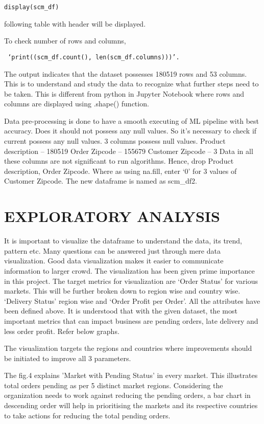 \documentclass[journal,twoside,web]{ieeecolor}
\begin{document}
\begin{verbatim}
display(scm_df)
 \end{verbatim}

following table with header will be displayed.

 To check number of rows and columns,

\begin{verbatim}
 ‘print((scm_df.count(), len(scm_df.columns)))’.
 \end{verbatim}

 The output indicates that the dataset possesses 180519 rows and 53 columns. This is to understand and study the data to recognize what further steps need to be taken. This is different from python in Jupyter Notebook where rows and columns are displayed using .shape() function.


Data pre-processing is done to have a smooth executing of ML pipeline with best accuracy. Does it should not possess any null values. So it’s necessary to check if current possess any null values. 3 columns possess null values. 
Product description – 180519
Order Zipcode – 155679
Customer Zipcode – 3
Data in all these columns are not significant to run algorithms. Hence, drop Product description, Order Zipcode. Where as using na.fill, enter ‘0’ for 3 values of Customer Zipcode. The new dataframe is named as scm{\_}df2.


\section{EXPLORATORY ANALYSIS}
It is important to visualize the dataframe to understand the data, its trend, pattern etc. Many questions can be answered just through mere data visualization. Good data visualization makes it easier to communicate information to larger crowd. The visualization has been given prime importance in this project. The target metrics for visualization are ‘Order Status’ for various markets. This will be further broken down to region wise and country wise. ‘Delivery Status’ region wise and ‘Order Profit per Order’.  All the attributes have been defined above. It is understood that with the given dataset, the most important metrics that can impact business are pending orders, late delivery and less order profit. Refer below graphs.


The visualization targets the regions and countries where improvements should be initiated to improve all 3 parameters.

The fig.4 explains 'Market with Pending Status'  in every market. This illustrates total orders pending as per 5 distinct market regions. Considering the organization needs to work against reducing the pending orders, a bar chart in descending order will help in prioritising the markets and its respective countries to take actions for reducing the total pending orders.
\end{document}
